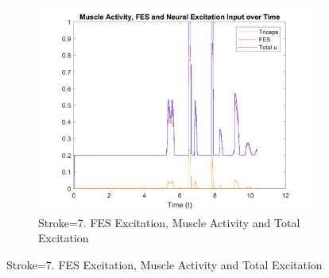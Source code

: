 \begin{landscape}
\begin{figure}[ht]
        \begin{subfigure}[b]{0.33\textwidth}
            \centering
            \includegraphics[width=\linewidth]{Pictures/Results/Controller/Stroke7/6_fes.png}
            \caption{Stroke=7. FES Excitation, Muscle Activity and Total Excitation}
        \end{subfigure}
        
        \vspace{2pt}


\end{figure}
\end{landscape}
